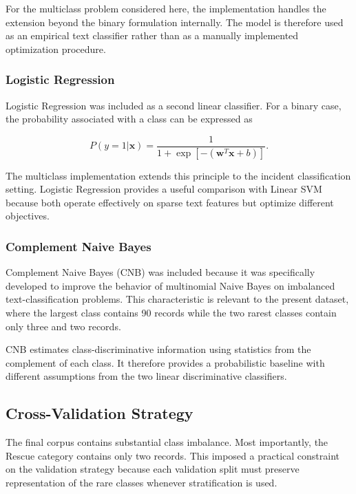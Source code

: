 \documentclass[conference]{IEEEtran}
\begin{document}
For the multiclass problem considered here, the implementation handles the
extension beyond the binary formulation internally. The model is therefore
used as an empirical text classifier rather than as a manually implemented
optimization procedure.

\subsubsection{Logistic Regression}

Logistic Regression was included as a second linear classifier. For a binary
case, the probability associated with a class can be expressed as

\begin{equation}
P(y=1|\mathbf{x})=
\frac{1}
{1+\exp[-(\mathbf{w}^{T}\mathbf{x}+b)]}.
\end{equation}

The multiclass implementation extends this principle to the incident
classification setting. Logistic Regression provides a useful comparison
with Linear SVM because both operate effectively on sparse text features but
optimize different objectives.

\subsubsection{Complement Naive Bayes}

Complement Naive Bayes (CNB) was included because it was specifically
developed to improve the behavior of multinomial Naive Bayes on imbalanced
text-classification problems. This characteristic is relevant to the present
dataset, where the largest class contains 90 records while the two rarest
classes contain only three and two records.

CNB estimates class-discriminative information using statistics from the
complement of each class. It therefore provides a probabilistic baseline with
different assumptions from the two linear discriminative classifiers.

\subsection{Cross-Validation Strategy}

The final corpus contains substantial class imbalance. Most importantly, the
Rescue category contains only two records. This imposed a practical
constraint on the validation strategy because each validation split must
preserve representation of the rare classes whenever stratification is used.
\end{document}

